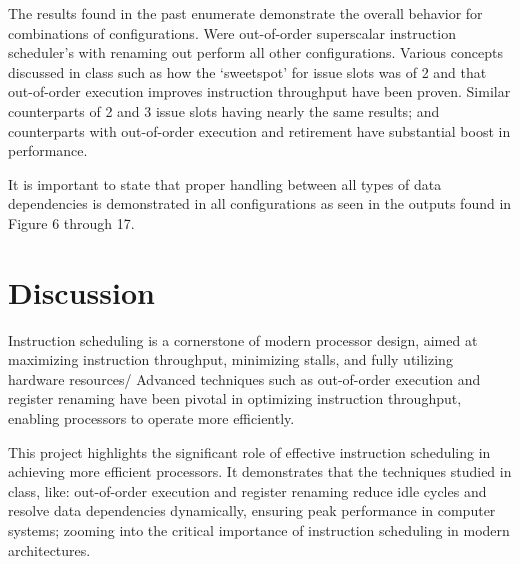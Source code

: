 \documentclass{article}
\begin{document}
The results found in the past enumerate demonstrate the overall behavior for combinations of configurations. Were out-of-order superscalar instruction scheduler's with renaming out perform all other configurations. Various concepts discussed in class such as how the `sweetspot' for issue slots was of 2 and that out-of-order execution improves instruction throughput have been proven. Similar counterparts of 2 and 3 issue slots having nearly the same results; and counterparts with out-of-order execution and retirement have substantial boost in performance. 

It is important to state that proper handling between all types of data dependencies is demonstrated in all configurations as seen in the outputs found in Figure 6 through 17. 

\section{Discussion}

Instruction scheduling is a cornerstone of modern processor design, aimed at maximizing instruction throughput, minimizing stalls, and fully utilizing hardware resources/ Advanced techniques such as out-of-order execution and register renaming have been pivotal in optimizing instruction throughput, enabling processors to operate more efficiently. 

This project highlights the significant role of effective instruction scheduling in achieving more efficient processors. It demonstrates that the techniques studied in class, like: out-of-order execution and register renaming reduce idle cycles and resolve data dependencies dynamically, ensuring peak performance in computer systems; zooming into the critical importance of instruction scheduling in modern architectures. 
\end{document}

